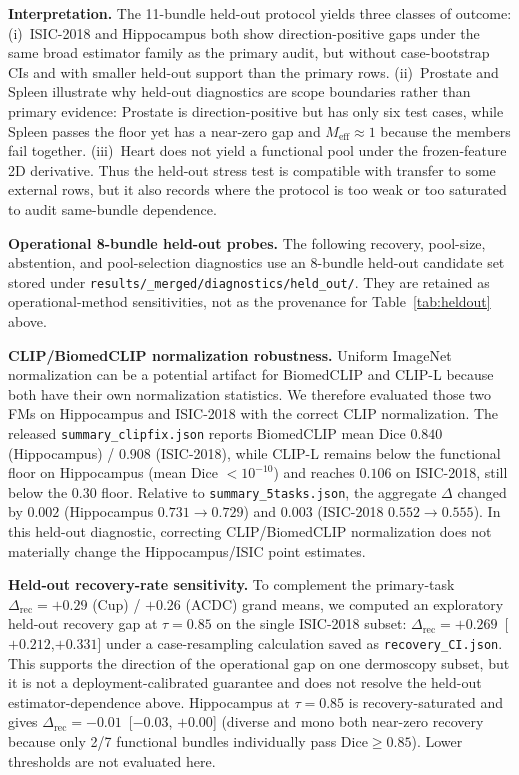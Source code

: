 \textbf{Interpretation.} The 11-bundle held-out protocol yields three classes of outcome: (i)~ISIC-2018 and Hippocampus both show direction-positive gaps under the same broad estimator family as the primary audit, but without case-bootstrap CIs and with smaller held-out support than the primary rows. (ii)~Prostate and Spleen illustrate why held-out diagnostics are scope boundaries rather than primary evidence: Prostate is direction-positive but has only six test cases, while Spleen passes the floor yet has a near-zero gap and $M_{\mathrm{eff}}\approx1$ because the members fail together. (iii)~Heart does not yield a functional pool under the frozen-feature 2D derivative. Thus the held-out stress test is compatible with transfer to some external rows, but it also records where the protocol is too weak or too saturated to audit same-bundle dependence.

\textbf{Operational 8-bundle held-out probes.} The following recovery, pool-size, abstention, and pool-selection diagnostics use an 8-bundle held-out candidate set stored under \texttt{results/\_merged/diagnostics/held\_out/}. They are retained as operational-method sensitivities, not as the provenance for Table~\ref{tab:heldout} above.

\textbf{CLIP/BiomedCLIP normalization robustness.} Uniform ImageNet normalization can be a potential artifact for BiomedCLIP and CLIP-L because both have their own normalization statistics. We therefore evaluated those two FMs on Hippocampus and ISIC-2018 with the correct CLIP normalization. The released \texttt{summary\_clipfix.json} reports BiomedCLIP mean Dice $0.840$ (Hippocampus) / $0.908$ (ISIC-2018), while CLIP-L remains below the functional floor on Hippocampus (mean Dice ${<}10^{-10}$) and reaches $0.106$ on ISIC-2018, still below the $0.30$ floor. Relative to \texttt{summary\_5tasks.json}, the aggregate $\Delta$ changed by $0.002$ (Hippocampus $0.731{\to}0.729$) and $0.003$ (ISIC-2018 $0.552{\to}0.555$). In this held-out diagnostic, correcting CLIP/BiomedCLIP normalization does not materially change the Hippocampus/ISIC point estimates.

\textbf{Held-out recovery-rate sensitivity.} To complement the primary-task $\Delta_{\mathrm{rec}}{=}+0.29$ (Cup) / $+0.26$ (ACDC) grand means, we computed an exploratory held-out recovery gap at $\tau{=}0.85$ on the single ISIC-2018 subset: $\Delta_{\mathrm{rec}}{=}+0.269$~[$+0.212$,$+0.331$] under a case-resampling calculation saved as \texttt{recovery\_CI.json}. This supports the direction of the operational gap on one dermoscopy subset, but it is not a deployment-calibrated guarantee and does not resolve the held-out estimator-dependence above. Hippocampus at $\tau{=}0.85$ is recovery-saturated and gives $\Delta_{\mathrm{rec}}{=}-0.01$~[$-0.03$, $+0.00$] (diverse and mono both near-zero recovery because only 2/7 functional bundles individually pass Dice${\geq}0.85$). Lower thresholds are not evaluated here.

